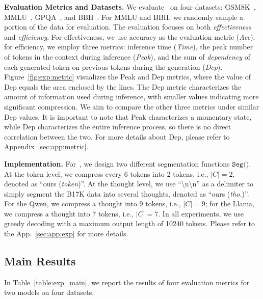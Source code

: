 \textbf{Evaluation Metrics and Datasets.}
We evaluate \ours~on four datasets: GSM8K~\citep{arxiv21_gsm8k}, MMLU~\citep{iclr21_mmlu}, GPQA~\citep{colm24_gpqa}, and BBH~\citep{acl23_bbh}. 
For MMLU and BBH, we randomly sample a portion of the data for evaluation. 
The evaluation focuses on both \textit{effectiveness} and \textit{efficiency}. 
For effectiveness, we use accuracy as the evaluation metric (\textit{Acc}); 
for efficiency, we employ three metrics: inference time (\textit{Time}), the peak number of tokens in the context during inference (\textit{Peak}), and the sum of \textit{dependency} of each generated token on previous tokens during the generation (\textit{Dep}). 
Figure~\ref{fig:exp:metric} visualizes the Peak and Dep metrics, where the value of Dep equals the area enclosed by the lines. 
The Dep metric characterizes the amount of information used during inference, with smaller values indicating more significant compression. 
We aim to compare the other three metrics under similar Dep values. 
It is important to note that Peak characterizes a momentary state, while Dep characterizes the entire inference process, so there is no direct correlation between the two. 
For more details about Dep, please refer to Appendix~\ref{sec:app:metric}.  

\textbf{Implementation.}
For~\ours, we design two different segmentation functions $\texttt{Seg()}$. 
At the token level, we compress every 6 tokens into 2 tokens, i.e., $|C|=2$, denoted as ``ours (\textit{token})''. 
At the thought level, we use ``{\textbackslash n\textbackslash n}'' as a delimiter to simply segment the B17K data into several thoughts, denoted as ``ours (\textit{tho.})''. 
For the Qwen, we compress a thought into 9 tokens, i.e., $|C|=9$; 
for the Llama, we compress a thought into 7 tokens, i.e., $|C|=7$. 
In all experiments, we use greedy decoding with a maximum output length of 10240 tokens.
Please refer to the App.~\ref{sec:app:exp} for more details.


\subsection{Main Results}
In Table~\ref{table:exp_main}, we report the results of four evaluation metrics for two models on four datasets.

